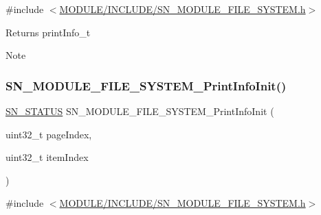 {\ttfamily \#include $<$\hyperlink{SN__MODULE__FILE__SYSTEM_8h}{M\+O\+D\+U\+L\+E/\+I\+N\+C\+L\+U\+D\+E/\+S\+N\+\_\+\+M\+O\+D\+U\+L\+E\+\_\+\+F\+I\+L\+E\+\_\+\+S\+Y\+S\+T\+E\+M.\+h}$>$}

\begin{DoxyReturn}{Returns}
print\+Info\+\_\+t 
\end{DoxyReturn}
\begin{DoxyNote}{Note}

\end{DoxyNote}
\mbox{\label{group__MODULE__FILE__SYSTEM_gadbd5aafed31faed399abd08193a04bc8}} 
\subsubsection{\texorpdfstring{S\+N\+\_\+\+M\+O\+D\+U\+L\+E\+\_\+\+F\+I\+L\+E\+\_\+\+S\+Y\+S\+T\+E\+M\+\_\+\+Print\+Info\+Init()}{SN\_MODULE\_FILE\_SYSTEM\_PrintInfoInit()}}
{\footnotesize\ttfamily \hyperlink{group__SYSTEM__ERROR_ga4540713b9a7a18ce44d78c3a10f7442f}{S\+N\+\_\+\+S\+T\+A\+T\+US} S\+N\+\_\+\+M\+O\+D\+U\+L\+E\+\_\+\+F\+I\+L\+E\+\_\+\+S\+Y\+S\+T\+E\+M\+\_\+\+Print\+Info\+Init (\begin{DoxyParamCaption}\item[{uint32\+\_\+t}]{page\+Index,  }\item[{uint32\+\_\+t}]{item\+Index }\end{DoxyParamCaption})}



{\ttfamily \#include $<$\hyperlink{SN__MODULE__FILE__SYSTEM_8h}{M\+O\+D\+U\+L\+E/\+I\+N\+C\+L\+U\+D\+E/\+S\+N\+\_\+\+M\+O\+D\+U\+L\+E\+\_\+\+F\+I\+L\+E\+\_\+\+S\+Y\+S\+T\+E\+M.\+h}$>$}


